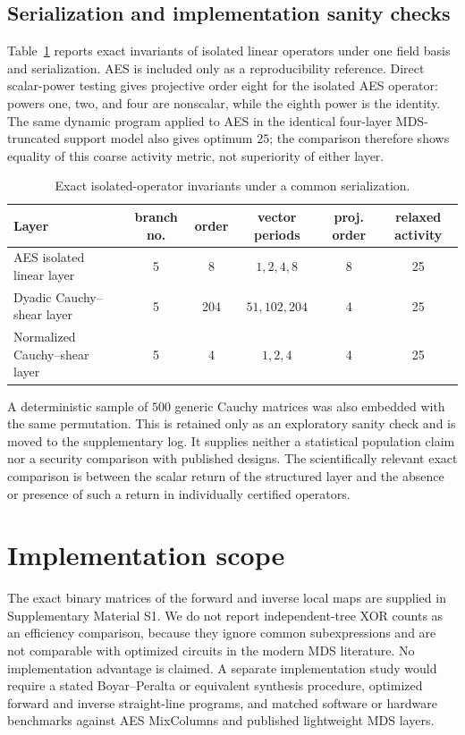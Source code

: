 \documentclass[10pt,reqno]{amsart}
\theoremstyle{plain}
\theoremstyle{remark}\newtheorem{remark}[theorem]{Remark}
\theoremstyle{definition}\newtheorem{definition}[theorem]{Definition}
\begin{document}
\subsection{Serialization and implementation sanity checks}
Table~\ref{tab:exact-comparison} reports exact invariants of isolated linear operators under one field basis and serialization. AES is included only as a reproducibility reference. Direct scalar-power testing gives projective order eight for the isolated AES operator: powers one, two, and four are nonscalar, while the eighth power is the identity. The same dynamic program applied to AES in the identical four-layer MDS-truncated support model also gives optimum $25$; the comparison therefore shows equality of this coarse activity metric, not superiority of either layer.
\begin{table}[ht]
\centering
\footnotesize
\caption{Exact isolated-operator invariants under a common serialization.}
\label{tab:exact-comparison}
\begin{tabularx}{\textwidth}{@{}Xccccc@{}}
\toprule
Layer & branch no. & order & vector periods & proj. order & relaxed activity\\
\midrule
AES isolated linear layer & 5 & 8 & $1,2,4,8$ & 8 & 25\\
Dyadic Cauchy--shear layer & 5 & 204 & $51,102,204$ & 4 & 25\\
Normalized Cauchy--shear layer & 5 & 4 & $1,2,4$ & 4 & 25\\
\bottomrule
\end{tabularx}
\end{table}

A deterministic sample of $500$ generic Cauchy matrices was also embedded with the same permutation. This is retained only as an exploratory sanity check and is moved to the supplementary log. It supplies neither a statistical population claim nor a security comparison with published designs. The scientifically relevant exact comparison is between the scalar return of the structured layer and the absence or presence of such a return in individually certified operators.

\section{Implementation scope}\label{sec:cost}
The exact binary matrices of the forward and inverse local maps are supplied in Supplementary Material S1. We do not report independent-tree XOR counts as an efficiency comparison, because they ignore common subexpressions and are not comparable with optimized circuits in the modern MDS literature. No implementation advantage is claimed. A separate implementation study would require a stated Boyar--Peralta or equivalent synthesis procedure, optimized forward and inverse straight-line programs, and matched software or hardware benchmarks against AES MixColumns and published lightweight MDS layers.
\end{document}
